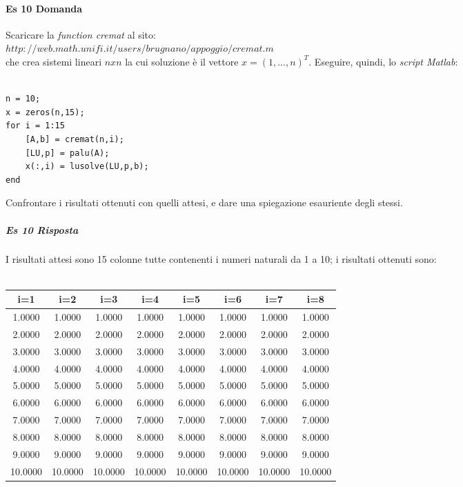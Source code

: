 \documentclass[a4paper]{report}
\begin{document}
\paragraph{Es 10 Domanda}
Scaricare la \emph{function cremat} al sito:\\
$http://web.math.unifi.it/users/brugnano/appoggio/cremat.m$\\
che crea sistemi lineari $nxn$ la cui soluzione è il vettore $x=(1,...,n)^T$.
Eseguire, quindi, lo \emph{script Matlab}:
\begin{lstlisting}

n = 10;
x = zeros(n,15);
for i = 1:15
	[A,b] = cremat(n,i);
	[LU,p] = palu(A);
	x(:,i) = lusolve(LU,p,b);
end
\end{lstlisting}
Confrontare i risultati ottenuti con quelli attesi, e dare una spiegazione esauriente degli stessi.
\subparagraph{Es 10 Risposta}
I risultati attesi sono 15 colonne tutte contenenti i numeri naturali da 1 a 10; i risultati ottenuti sono:\\\\
\begin{tabular}{|c|c|c|c|c|c|c|c|}
	\hline
i=1&i=2&i=3&i=4&i=5&i=6&i=7&i=8\\
	\hline 
	1.0000& 1.0000& 1.0000& 1.0000& 1.0000&1.0000& 1.0000& 1.0000\\
	\hline
	2.0000& 2.0000& 2.0000& 2.0000& 2.0000& 2.0000& 2.0000& 2.0000\\
	\hline
	3.0000& 3.0000& 3.0000& 3.0000& 3.0000 & 3.0000& 3.0000& 3.0000\\
	\hline
	4.0000& 4.0000& 4.0000& 4.0000& 4.0000& 4.0000& 4.0000& 4.0000\\
	\hline
	5.0000& 5.0000& 5.0000& 5.0000& 5.0000& 5.0000& 5.0000& 5.0000\\
	\hline
	6.0000& 6.0000& 6.0000& 6.0000& 6.0000& 6.0000& 6.0000& 6.0000\\
	\hline
	7.0000& 7.0000& 7.0000& 7.0000& 7.0000& 7.0000& 7.0000& 7.0000\\
	\hline
	8.0000& 8.0000& 8.0000& 8.0000& 8.0000& 8.0000& 8.0000& 8.0000\\
	\hline
	9.0000& 9.0000& 9.0000& 9.0000& 9.0000& 9.0000& 9.0000& 9.0000\\
	\hline
	10.0000&10.0000&10.0000&10.0000&10.0000&10.0000&10.0000&10.0000\\
	\hline
\end{tabular}
\\\\\\
\end{document}
